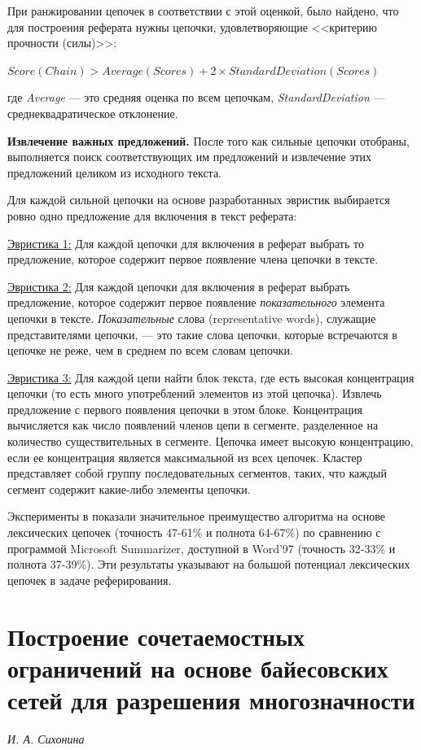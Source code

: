 \documentclass{article}
\begin{document}
\begin{articletext}
При ранжировании цепочек в соответствии с этой оценкой, было найдено, что для построения реферата нужны цепочки, удовлетворяющие <<критерию прочности (силы)>>:

\begin{center}
$Score(Chain) > Average(Scores) + 2 \times StandardDeviation(Scores)$
\end{center}

где \textit{Average} --- это средняя оценка по всем цепочкам, \textit{StandardDeviation} --- среднеквадратическое отклонение.

\textbf{Извлечение важных предложений.} После того как сильные цепочки отобраны, выполняется поиск соответствующих им предложений и извлечение этих предложений целиком из исходного текста.

Для каждой сильной цепочки на основе разработанных эвристик выбирается ровно одно предложение для включения в текст реферата:

\underline{Эвристика 1:} Для каждой цепочки для включения в реферат выбрать то предложение, которое содержит первое появление члена цепочки в тексте.

\underline{Эвристика 2:} Для каждой цепочки для включения в реферат выбрать предложение, которое содержит первое появление \textit{показательного} элемента цепочки в тексте. \textit{Показательные} слова (representative words), служащие представителями цепочки, --- это такие слова цепочки, которые встречаются в цепочке не реже, чем в среднем по всем словам цепочки.

\underline{Эвристика 3:} Для каждой цепи найти блок текста, где есть высокая концентрация цепочки (то есть много употреблений элементов из этой цепочка). Извлечь предложение с первого появления цепочки в этом блоке. Концентрация вычисляется как число появлений членов цепи в сегменте, разделенное на количество существительных в сегменте. Цепочка имеет высокую концентрацию, если ее концентрация является максимальной из всех цепочек. Кластер представляет собой группу последовательных сегментов, таких, что каждый сегмент содержит какие-либо элементы цепочки.

Эксперименты в \cite{Barzilay Elhadad 1997} показали значительное преимущество алгоритма на основе лексических цепочек (точность 47-61\% и полнота 64-67\%) по сравнению с программой Microsoft Summarizer, доступной в Word’97 (точность 32-33\% и полнота 37-39\%). Эти результаты указывают на большой потенциал лексических цепочек в задаче реферирования.


\section{Построение сочетаемостных ограничений на основе байесовских сетей для разрешения многозначности}
\begin{flushright}
\textit{И. А. Сихонина} 
\end{flushright}


\end{articletext}
\end{document}

